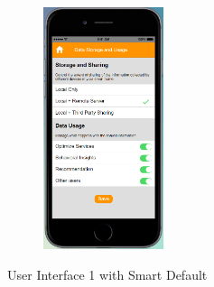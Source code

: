 \begin{appendices}
\begin{figure}
\begin{subfigure}[t]{0.24\textwidth}
	\end{subfigure}%
	~
	\begin{subfigure}[t]{0.24\textwidth}
		\centering
		\includegraphics[height=2.8in]{figures/ui1sd4.png}
	\end{subfigure}%
	\caption{User Interface 1 with Smart Default}
	\label{fig:ui1OneR}
\end{figure}


\end{appendices}

